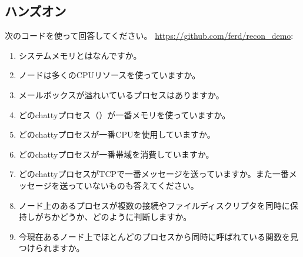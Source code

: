 \subsection*{ハンズオン}

次のコードを使って回答してください。 \href{https://github.com/ferd/recon\_demo}{https://github.com/ferd/recon\_demo}:

\begin{enumerate}
  \item システムメモリとはなんですか。
  \item ノードは多くのCPUリソースを使っていますか。
  \item メールボックスが溢れいているプロセスはありますか。
  \item どのchattyプロセス（）が一番メモリを使っていますか。
  \item どのchattyプロセスが一番CPUを使用していますか。
  \item どのchattyプロセスが一番帯域を消費していますか。
  \item どのchattyプロセスがTCPで一番メッセージを送っていますか。また一番メッセージを送っていないものも答えてください。
  \item ノード上のあるプロセスが複数の接続やファイルディスクリプタを同時に保持しがちかどうか、どのように判断しますか。
  \item 今現在あるノード上でほとんどのプロセスから同時に呼ばれている関数を見つけられますか。
\end{enumerate}

